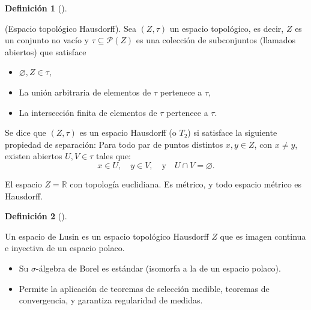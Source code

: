 \documentclass[
  spanish,
  us-letterpaper,
]{scrreprt}
\theoremstyle{plain}
\theoremstyle{plain}
\theoremstyle{definition}
\newtheorem{definition}{Definición}[chapter]
\theoremstyle{remark}
\begin{document}
\begin{definition}[]\protect\hypertarget{def-Espacio_topológico_Hausdorff}{}\label{def-Espacio_topológico_Hausdorff}

(Espacio topológico Hausdorff). Sea \((Z, \tau)\) un espacio topológico,
es decir, \(Z\) es un conjunto no vacío y
\(\tau \subseteq \mathcal{P}(Z)\) es una colección de subconjuntos
(llamados abiertos) que satisface

\begin{itemize}
\item
  \(\varnothing, Z \in \tau\),
\item
  La unión arbitraria de elementos de \(\tau\) pertenece a \(\tau\),
\item
  La intersección finita de elementos de \(\tau\) pertenece a \(\tau\).
\end{itemize}

Se dice que \((Z, \tau)\) es un espacio Hausdorff (o \(T_2\)) si
satisface la siguiente propiedad de separación: Para todo par de puntos
distintos \(x, y \in Z\), con \(x \neq y\), existen abiertos
\(U, V \in \tau\) tales que:
\[x \in U,\quad y \in V,\quad \text{y} \quad U \cap V = \varnothing.\]

\end{definition}

\begin{tcolorbox}[enhanced jigsaw, arc=.35mm, bottomrule=.15mm, bottomtitle=1mm, breakable, colback=white, colbacktitle=quarto-callout-caution-color!10!white, colframe=quarto-callout-caution-color-frame, coltitle=black, left=2mm, leftrule=.75mm, opacityback=0, opacitybacktitle=0.6, rightrule=.15mm, title={Ejemplo (\textbf{\emph{Espacio topológicoHausdorff}})}, titlerule=0mm, toprule=.15mm, toptitle=1mm]

El espacio \(Z= \mathbb{R}\) con topología euclidiana. Es métrico, y
todo espacio métrico es Hausdorff.

\end{tcolorbox}

\begin{definition}[]\protect\hypertarget{def-Espacio_Lusin}{}\label{def-Espacio_Lusin}

Un espacio de Lusin es un espacio topológico Hausdorff \(Z\) que es
imagen continua e inyectiva de un espacio polaco.

\begin{itemize}
\item
  Su \(\sigma\)-álgebra de Borel es estándar (isomorfa a la de un
  espacio polaco).
\item
  Permite la aplicación de teoremas de selección medible, teoremas de
  convergencia, y garantiza regularidad de medidas.
\end{itemize}

\end{definition}
\end{document}
